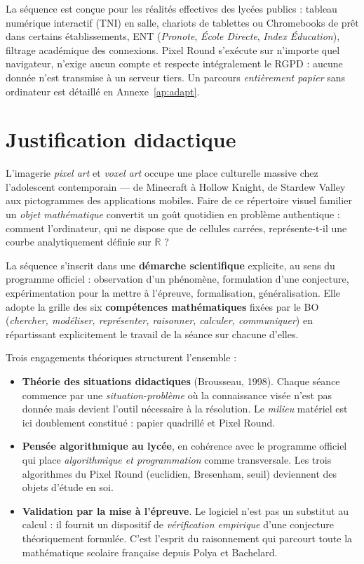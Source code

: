 \documentclass[12pt,a4paper]{scrartcl}
\newcommand{\acc}[1]{\textcolor{accent}{\textbf{#1}}}
\begin{document}
\begin{note}
La séquence est conçue pour les réalités effectives des lycées publics : tableau numérique interactif (TNI) en salle, chariots de tablettes ou Chromebooks de prêt dans certains établissements, ENT (\emph{Pronote}, \emph{École Directe}, \emph{Index Éducation}), filtrage académique des connexions. Pixel Round s'exécute sur n'importe quel navigateur, n'exige aucun compte et respecte intégralement le RGPD : aucune donnée n'est transmise à un serveur tiers. Un parcours \emph{entièrement papier} sans ordinateur est détaillé en Annexe~\ref{ap:adapt}.
\end{note}

\section{Justification didactique}

L'imagerie \emph{pixel art} et \emph{voxel art} occupe une place culturelle massive chez l'adolescent contemporain --- de Minecraft à Hollow Knight, de Stardew Valley aux pictogrammes des applications mobiles. Faire de ce répertoire visuel familier un \emph{objet mathématique} convertit un goût quotidien en problème authentique : comment l'ordinateur, qui ne dispose que de cellules carrées, représente-t-il une courbe analytiquement définie sur $\mathbb{R}$ ?

La séquence s'inscrit dans une \acc{démarche scientifique} explicite, au sens du programme officiel : observation d'un phénomène, formulation d'une conjecture, expérimentation pour la mettre à l'épreuve, formalisation, généralisation. Elle adopte la grille des six \acc{compétences mathématiques} fixées par le BO (\emph{chercher, modéliser, représenter, raisonner, calculer, communiquer}) en répartissant explicitement le travail de la séance sur chacune d'elles.

Trois engagements théoriques structurent l'ensemble :

\begin{itemize}[leftmargin=1.3em,itemsep=0.15em,topsep=0.3em]
  \item \acc{Théorie des situations didactiques} (Brousseau, 1998). Chaque séance commence par une \emph{situation-problème} où la connaissance visée n'est pas donnée mais devient l'outil nécessaire à la résolution. Le \emph{milieu} matériel est ici doublement constitué : papier quadrillé et Pixel Round.
  \item \acc{Pensée algorithmique au lycée}, en cohérence avec le programme officiel qui place \emph{algorithmique et programmation} comme transversale. Les trois algorithmes du Pixel Round (euclidien, Bresenham, seuil) deviennent des objets d'étude en soi.
  \item \acc{Validation par la mise à l'épreuve}. Le logiciel n'est pas un substitut au calcul : il fournit un dispositif de \emph{vérification empirique} d'une conjecture théoriquement formulée. C'est l'esprit du raisonnement qui parcourt toute la mathématique scolaire française depuis Polya et Bachelard.
\end{itemize}
\end{document}
